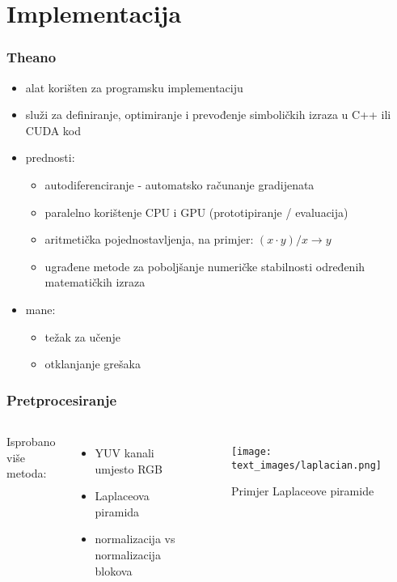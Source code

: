 \documentclass[utf8]{beamer}
\begin{document}
\section{Implementacija}

\begin{frame}
\frametitle{Theano}

\begin{itemize}
  \item alat korišten za programsku implementaciju
  \item služi za definiranje, optimiranje i prevođenje simboličkih izraza u C++ ili CUDA kod
  \item prednosti:
  \begin{itemize}
      \item autodiferenciranje - automatsko računanje gradijenata
      \item paralelno korištenje CPU i GPU (prototipiranje / evaluacija)
      \item aritmetička pojednostavljenja, na primjer: $(x \cdot y) / x \rightarrow y$
      \item ugrađene metode za poboljšanje numeričke stabilnosti određenih matematičkih izraza
  \end{itemize}
  \item mane:
  \begin{itemize}
      \item težak za učenje
      \item otklanjanje grešaka
  \end{itemize}
\end{itemize}

\end{frame}


\begin{frame}
\frametitle{Pretprocesiranje}

\begin{columns}[c]

Isprobano više metoda:
  \begin{itemize}
    \item YUV kanali umjesto RGB
    \item Laplaceova piramida
    \item normalizacija vs normalizacija blokova
  \end{itemize}

\begin{figure}[htb]
  \centering
  \texttt{[image: text\_images/laplacian.png]}
  \caption{Primjer Laplaceove piramide}
\end{figure}

\end{columns}

\end{frame}
\end{document}
